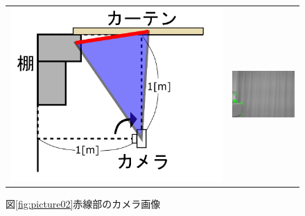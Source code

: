 \begin{figure}[h]
　\begin{tabular}{cc}
      \begin{minipage}[t]{0.45\hsize}
        \centering
        \includegraphics[width=1.0\linewidth]{figs/picture02.jpg}
        \caption{実験概略図}
        \label{fig:picture02}
        \end{minipage} &

      \begin{minipage}[t]{0.45\hsize}
        \centering
        \includegraphics[width=1.0\linewidth]{figs/Tracking02.jpg}
        \caption{図\ref{fig:picture02}赤線部のカメラ画像}
        \label{fig:Tracking02}
  \end{minipage}

 \end{tabular}
\end{figure}

